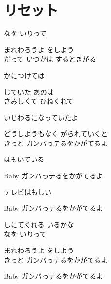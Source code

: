 \section{ リセット}
\large{

なを いりって

まれわろうよ をしよう
\\

だって いつかは するときがる

かにつけては 

じていた あのは
\\

さみしくて ひねくれて

いじわるになっていたよ

どうしようもなく がられていくと
\\

きっと ガンバっテるをかがてるよ

はもいている

Baby ガンバっテるをかがてるよ

テレビはもしい

Baby ガンバっテるをかがてるよ

しにてくれる いるかな
\\

なを いりって

まれわろうよ をしよう
\\

きっと ガンバっテるをかがてるよ

Baby ガンバっテるをかがてるよ

}